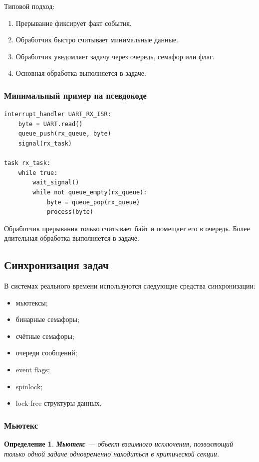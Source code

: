 \documentclass[12pt,a4paper]{article}
\newtheorem{definition}{Определение}
\begin{document}
Типовой подход:
\begin{enumerate}
    \item Прерывание фиксирует факт события.
    \item Обработчик быстро считывает минимальные данные.
    \item Обработчик уведомляет задачу через очередь, семафор или флаг.
    \item Основная обработка выполняется в задаче.
\end{enumerate}

\subsubsection{Минимальный пример на псевдокоде}

\begin{verbatim}
interrupt_handler UART_RX_ISR:
    byte = UART.read()
    queue_push(rx_queue, byte)
    signal(rx_task)

task rx_task:
    while true:
        wait_signal()
        while not queue_empty(rx_queue):
            byte = queue_pop(rx_queue)
            process(byte)
\end{verbatim}

Обработчик прерывания только считывает байт и помещает его в очередь. Более длительная обработка выполняется в задаче.

\subsection{Синхронизация задач}

В системах реального времени используются следующие средства синхронизации:
\begin{itemize}
    \item мьютексы;
    \item бинарные семафоры;
    \item счётные семафоры;
    \item очереди сообщений;
    \item event flags;
    \item spinlock;
    \item lock-free структуры данных.
\end{itemize}

\subsubsection{Мьютекс}

\begin{definition}
\textbf{Мьютекс} --- объект взаимного исключения, позволяющий только одной задаче одновременно находиться в критической секции.
\end{definition}
\end{document}
